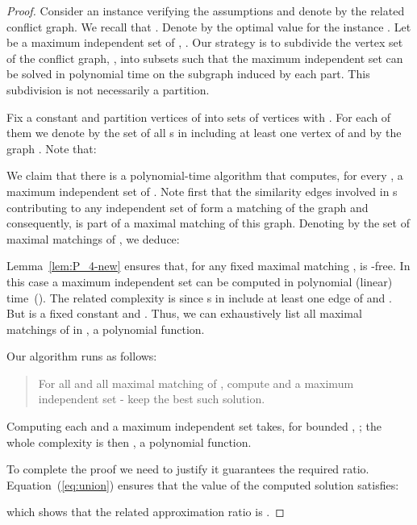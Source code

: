 \documentclass[final]{dmtcs-episciences}
\begin{document}
\begin{proof}
Consider an instance  verifying the assumptions and denote by  the related conflict graph. We recall that . Denote by  the optimal value for the instance .
Let  be a maximum independent set of , . 
Our strategy is to subdivide the vertex set of the conflict graph, , into  subsets such that the maximum independent set can be solved in polynomial time on the subgraph induced by each part. This subdivision is not necessarily a partition.

Fix a constant  and partition vertices of 
 into  sets of vertices   with . For each of them we denote by   the set of all s in  including at least one vertex of   and by  the graph . Note that: 
 
 

We claim that there is a polynomial-time algorithm that computes, for every , a maximum independent set of .  
Note first that the similarity edges involved in s contributing to any independent set of  form a matching of the graph  and consequently, is part of a maximal matching of this graph. Denoting by  the set of maximal matchings of , we deduce:



Lemma~\ref{lem:P_4-new} ensures that, for any fixed maximal matching ,  is -free. In this case a maximum independent set can be computed in polynomial (linear) time~(\citet{golumbicbook}). The related complexity is  since s in  include at least one edge of  and .  But  is a fixed constant and . Thus, we can exhaustively list all maximal matchings of  in , a polynomial function.  

Our algorithm runs as follows: 
\begin{quote}
\begin{em}
For all  and all maximal matching  of , compute   and a maximum independent set  \-- keep the best such solution. 
\end{em}
\end{quote}
\noindent
Computing each  and a maximum independent set takes, for bounded , ;  the whole complexity is then
, a polynomial function.
 
To complete the proof we need to justify it guarantees the required ratio. Equation~(\ref{eq:union}) ensures that the value  of the computed solution satisfies:

which shows that the related approximation ratio is . 
\end{proof}
\end{document}
